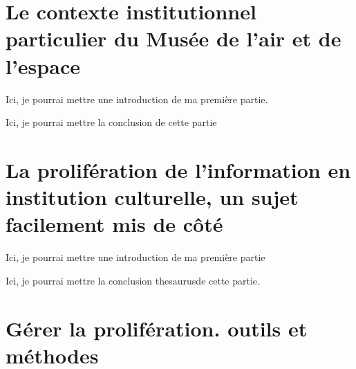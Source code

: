 \documentclass[12pt,twoside]{book}
\begin{document}
\newpage{\pagestyle{empty}\cleardoublepage}

	\mainmatter

	

	\part{Le contexte institutionnel particulier du Musée de l'air et de l'espace}


Ici, je pourrai mettre une introduction de ma première partie.




Ici, je pourrai mettre la conclusion de cette partie

%
%	
	
	\part{La prolifération de l’information en institution culturelle, un sujet facilement mis de côté}
	
	
	
	Ici, je pourrai mettre une introduction de ma première partie
	
	
	
	
	
	Ici, je pourrai mettre la conclusion \gls{thesaurus}de cette partie.
	
		\part{Gérer la prolifération. outils et méthodes}
	
	
	
\end{document}
